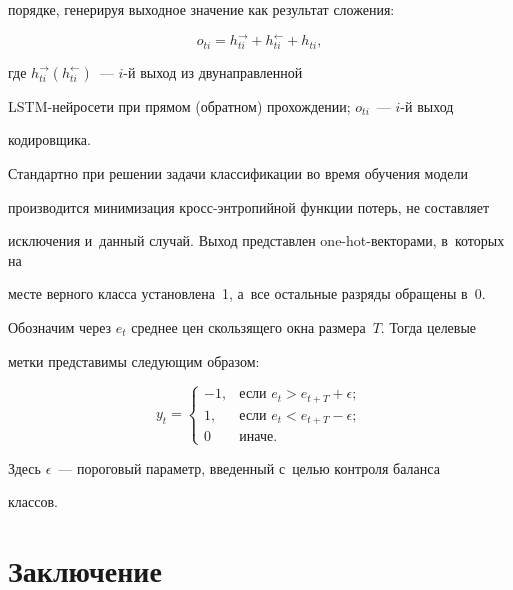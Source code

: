 порядке, генерируя выходное значение как результат сложения:

\begin{equation*}

    o_{ti} = h^{\rightarrow}_{ti} + h^{\leftarrow}_{ti} + h_{ti},

\end{equation*}

где $h^{\rightarrow}_{ti}(h^{\leftarrow}_{ti})$~--- $i$-й выход из двунаправленной 

LSTM-ней\-ро\-се\-ти при прямом (обратном) прохождении; $o_{ti}$~--- $i$-й выход 

кодировщика.



Стандартно при решении задачи классификации во время обучения модели 

производится минимизация кросс-энт\-ро\-пий\-ной функции потерь, не составляет 

исключения и~данный случай. Выход пред\-став\-лен one-hot-векторами, в~которых на 

месте верного класса установлена~1, а~все остальные разряды обращены в~0.



Обозначим через $e_t$ среднее цен скользящего окна размера~$T$. Тогда целевые 

мет\-ки пред\-ста\-ви\-мы сле\-ду\-ющим образом:

\begin{equation*}

y_t =

    \begin{cases}

    -1, & \mbox{если } e_t > e_{t+T} + \epsilon ;\\

    1, & \mbox{если } e_t < e_{t+T} - \epsilon ;\\

    0 & \mbox{иначе}.

    \end{cases}

\end{equation*}

Здесь $\epsilon$~--- пороговый параметр, введенный с~\mbox{целью} контроля баланса 

классов.





\section{Заключение}



